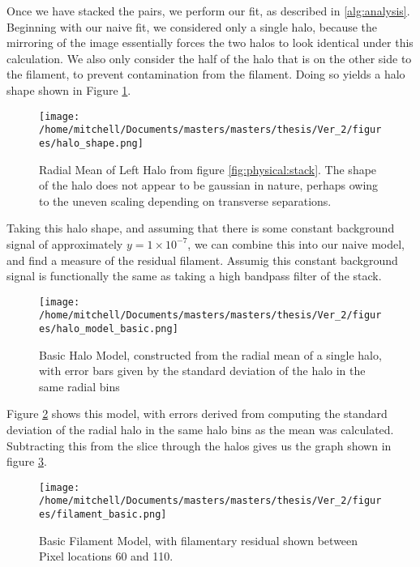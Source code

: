 Once we have stacked the pairs, we perform our fit, as described in \ref{alg:analysis}. Beginning with our naive fit, we considered only a single halo, because the mirroring of the image essentially forces the two halos to look identical under this calculation. We also only consider the half of the halo that is on the other side to the filament, to prevent contamination from the filament. Doing so yields a halo shape shown in Figure \ref{fig:halo:single}.

\begin{figure}[h!]
\centering
\texttt{[image: /home/mitchell/Documents/masters/masters/thesis/Ver\_2/figures/halo\_shape.png]}
\caption{ Radial Mean of Left Halo from figure \ref{fig:physical:stack}. The shape of the halo does not appear to be gaussian in nature, perhaps owing to the uneven scaling depending on transverse separations. }
\label{fig:halo:single}
\end{figure}

Taking this halo shape, and assuming that there is some constant background signal of approximately $y = 1\times 10^{-7}$, we can combine this into our naive model, and find a measure of the residual filament. Assumig this constant background signal is functionally the same as taking a high bandpass filter of the stack. 


\begin{figure}[h!]
\centering
\texttt{[image: /home/mitchell/Documents/masters/masters/thesis/Ver\_2/figures/halo\_model\_basic.png]}
\caption{ Basic Halo Model, constructed from the radial mean of a single halo, with error bars given by the standard deviation of the halo in the same radial bins }
\label{fig:halo:basic_model}
\end{figure}

Figure \ref{fig:halo:basic_model} shows this model, with errors derived from computing the standard deviation of the radial halo in the same halo bins as the mean was calculated. Subtracting this from the slice through the halos gives us the graph shown in figure \ref{fig:halo:basic_filament}.

\begin{figure}[h!]
\centering
\texttt{[image: /home/mitchell/Documents/masters/masters/thesis/Ver\_2/figures/filament\_basic.png]}
\caption{ Basic Filament Model, with filamentary residual shown between Pixel locations 60 and 110. }
\label{fig:halo:basic_filament}
\end{figure}

